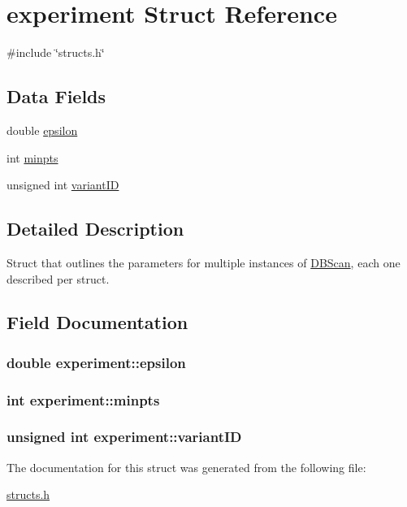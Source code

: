 \hypertarget{structexperiment}{\section{experiment Struct Reference}
\label{structexperiment}
}


{\ttfamily \#include \char`\"{}structs.\-h\char`\"{}}

\subsection*{Data Fields}
\begin{DoxyCompactItemize}
\item 
double \hyperlink{structexperiment_a70602e57b3b76374d22d13d09676c6b9}{epsilon}
\item 
int \hyperlink{structexperiment_aec1a30392753fcec1d80ff38a8153abf}{minpts}
\item 
unsigned int \hyperlink{structexperiment_ad062e46649cd40a782750159d0ce0d05}{variant\-I\-D}
\end{DoxyCompactItemize}


\subsection{Detailed Description}
Struct that outlines the parameters for multiple instances of \hyperlink{classDBScan}{D\-B\-Scan}, each one described per struct. 

\subsection{Field Documentation}
\hypertarget{structexperiment_a70602e57b3b76374d22d13d09676c6b9}{
\subsubsection[{epsilon}]{\setlength{\rightskip}{0pt plus 5cm}double experiment\-::epsilon}}\label{structexperiment_a70602e57b3b76374d22d13d09676c6b9}
\hypertarget{structexperiment_aec1a30392753fcec1d80ff38a8153abf}{
\subsubsection[{minpts}]{\setlength{\rightskip}{0pt plus 5cm}int experiment\-::minpts}}\label{structexperiment_aec1a30392753fcec1d80ff38a8153abf}
\hypertarget{structexperiment_ad062e46649cd40a782750159d0ce0d05}{
\subsubsection[{variant\-I\-D}]{\setlength{\rightskip}{0pt plus 5cm}unsigned int experiment\-::variant\-I\-D}}\label{structexperiment_ad062e46649cd40a782750159d0ce0d05}


The documentation for this struct was generated from the following file\-:\begin{DoxyCompactItemize}
\item 
\hyperlink{structs_8h}{structs.\-h}\end{DoxyCompactItemize}
